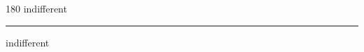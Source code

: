 
\begin{frame}
\begin{center}
\begin{turn}{180}
{\fontsize{2.5cm}{1em}\selectfont indifferent}
\end{turn}
\vspace{1em}\par  
\hrule
\vspace{1em}\par  
{\fontsize{2.5cm}{1em}\selectfont indifferent}
\end{center}
\end{frame}
